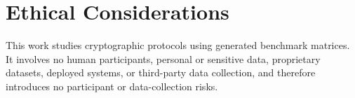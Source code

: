 \section*{Ethical Considerations}
\label{app:ethics}
This work studies cryptographic protocols using generated benchmark matrices.
It involves no human participants, personal or sensitive data, proprietary
datasets, deployed systems, or third-party data collection, and therefore
introduces no participant or data-collection risks.
